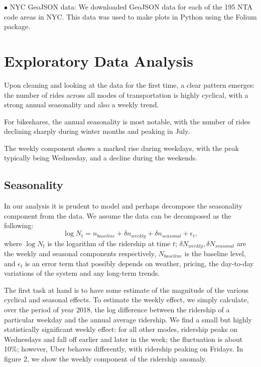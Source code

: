 \documentclass[12pt]{article}
\begin{document}
$\bullet$ NYC GeoJSON data: We downloaded GeoJSON data for each of the 195 NTA code areas in NYC. This data was used to make plots in Python using the Folium package. 


\section*{Exploratory Data Analysis}

Upon cleaning and looking at the data for the first time, a clear pattern emerges: the number of rides across all modes of transportation is highly cyclical, with a strong annual seasonality and also a weekly trend. 

For bikeshares, the annual seasonality is most notable, with the number of rides declining sharply during winter months and peaking in July. 

The weekly component shows a marked rise during weekdays, with the peak typically being Wednesday, and a decline during the weekends.

\subsection*{Seasonality}
In our analysis it is prudent to model and perhaps decompose the seasonality component from the data. We assume the data can be decomposed as the following: 
\begin{equation}
    \log{N}_t = n_{baseline} + \delta n_{weekly} + \delta n_{seasonal} +  \epsilon_t,
\end{equation}
where $\log{N}_t$ is the logarithm of the ridership at time $t$; $\delta N_{weekly}, \delta N_{seasonal}$ are the weekly and seasonal components respectively, $N_{baseline}$ is the baseline level, and $\epsilon_t$ is an error term that possibly depends on weather, pricing, the day-to-day variations of the system and any long-term trends.


The first task at hand is to have some estimate of the magnitude of the various cyclical and seasonal effects. To estimate the weekly effect, we simply calculate, over the period of year 2018, the log difference between the ridership of a particular weekday and the annual average ridership. We find a small but highly statistically significant weekly effect: for all other modes, ridership peaks on Wednesdays and fall off earlier and later in the week; the fluctuation is about 10\%; however, Uber behaves differently, with ridership peaking on Fridays. In figure 2, we show the weekly component of the ridership anomaly.
\end{document}
